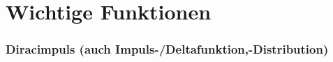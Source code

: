 



\section{Wichtige Funktionen}

\small

\subsubsection*{Diracimpuls \tiny (auch Impuls-/Deltafunktion,-Distribution)}

